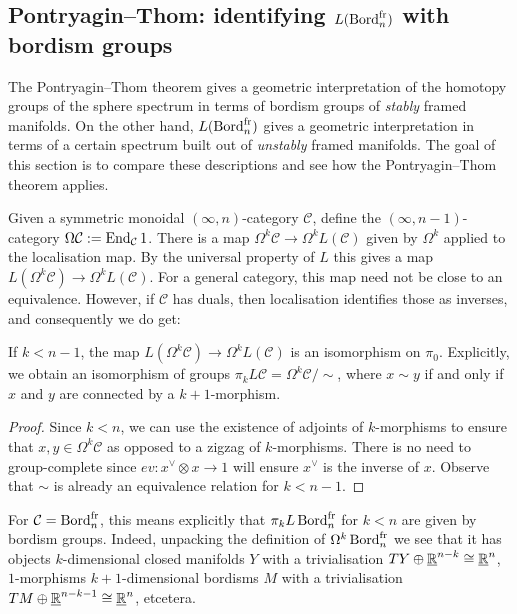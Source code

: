 \documentclass{amsart}
\begin{document}
\subsection{Pontryagin--Thom: identifying \texorpdfstring{$L(\operatorname{Bord}_n^{\mathrm{fr}})$}{L(Bord)} with bordism groups}

The Pontryagin--Thom theorem gives a geometric interpretation of the homotopy groups of the sphere spectrum in terms of bordism groups of \emph{stably} framed manifolds.
On the other hand, $L(\operatorname{Bord}_n^{\mathrm{fr}})$ gives a geometric interpretation in terms of a certain spectrum built out of \emph{unstably} framed manifolds.
The goal of this section is to compare these descriptions and see how the Pontryagin--Thom theorem applies.


    Given a symmetric monoidal $(\infty,n)$-category $\mathcal{C}$, define the $(\infty,n-1)$-category $\Omega \mathcal{C} := \operatorname{End}_{\mathcal{C}} 1$.
    There is a map
     $\Omega^k \mathcal{C} \to \Omega^k L(\mathcal{C})$ given by $\Omega^k$ applied to the localisation map. %
     By the universal property of $L$ this gives a map $L(\Omega^k\mathcal{C}) \to \Omega^k L(\mathcal{C})$.
     For a general category, this map need not be close to an equivalence.
     However, if $\mathcal{C}$ has duals, then localisation identifies those as inverses, and consequently we do get:

\begin{lemma}
    If $k<n-1$, the map $L(\Omega^k\mathcal{C}) \to \Omega^k L(\mathcal{C})$ is an isomorphism on $\pi_0$.
    Explicitly, we obtain an isomorphism of groups $\pi_k L \mathcal{C} = \Omega^k \mathcal{C}/\sim$, where $x \sim y$ if and only if $x$ and $y$ are connected by a $k+1$-morphism.
\end{lemma}
\begin{proof}
    Since $k<n$, we can use the existence of adjoints of $k$-morphisms to ensure that $x,y \in \Omega^k \mathcal{C}$ as opposed to a zigzag of $k$-morphisms.
    There is no need to group-complete since $ev\colon x^\vee \otimes x \to 1$ will ensure $x^\vee$ is the inverse of $x$.
    Observe that $\sim$ is already an equivalence relation for $k < n-1$.
\end{proof}

For $\mathcal{C} = \operatorname{Bord}_n^{\mathrm{fr}}$, this means explicitly that $\pi_k L \operatorname{Bord}_n^{\mathrm{fr}}$ for $k<n$ are given by bordism groups.
Indeed, unpacking the definition of $\Omega^k \operatorname{Bord}_n^{\mathrm{fr}}$ we see that it has objects $k$-dimensional closed manifolds $Y$ with a trivialisation $TY \oplus \underline{\mathbb{R}}^{n-k} \cong \underline{\mathbb{R}}^n$, $1$-morphisms $k+1$-dimensional bordisms $M$ with a trivialisation $TM \oplus \underline{\mathbb{R}}^{n-k-1} \cong \underline{\mathbb{R}}^n$, etcetera.
\end{document}
